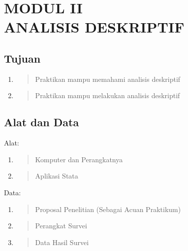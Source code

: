 \documentclass[
]{article}
\author{}
\date{}
\begin{document}
\hypertarget{modul-ii-analisis-deskriptif}{%
\section{\texorpdfstring{MODUL II\\
ANALISIS DESKRIPTIF
}{MODUL II ANALISIS DESKRIPTIF }}\label{modul-ii-analisis-deskriptif}}

\hypertarget{tujuan}{%
\subsection{Tujuan}\label{tujuan}}

\begin{enumerate}
\def\labelenumi{\arabic{enumi}.}
\item
  \begin{quote}
  Praktikan mampu memahami analisis deskriptif
  \end{quote}
\item
  \begin{quote}
  Praktikan mampu melakukan analisis deskriptif
  \end{quote}
\end{enumerate}

\hypertarget{section}{%
\subsection{}\label{section}}

\hypertarget{alat-dan-data}{%
\subsection{Alat dan Data}\label{alat-dan-data}}

Alat:

\begin{enumerate}
\def\labelenumi{\arabic{enumi}.}
\item
  \begin{quote}
  Komputer dan Perangkatnya
  \end{quote}
\item
  \begin{quote}
  Aplikasi Stata
  \end{quote}
\end{enumerate}

Data:

\begin{enumerate}
\def\labelenumi{\arabic{enumi}.}
\item
  \begin{quote}
  Proposal Penelitian (Sebagai Acuan Praktikum)
  \end{quote}
\item
  \begin{quote}
  Perangkat Survei
  \end{quote}
\item
  \begin{quote}
  Data Hasil Survei
  \end{quote}
\end{enumerate}
\end{document}

